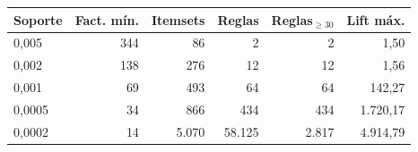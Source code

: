 \begin{tabular}{lrrrrr}
\toprule
\textbf{Soporte} & \textbf{Fact. mín.} & \textbf{Itemsets} & \textbf{Reglas} & \textbf{Reglas$_{\geq 30}$} & \textbf{Lift máx.} \\
\midrule
0,005 & 344 & 86 & 2 & 2 & 1,50 \\
0,002 & 138 & 276 & 12 & 12 & 1,56 \\
0,001 & 69 & 493 & 64 & 64 & 142,27 \\
0,0005 & 34 & 866 & 434 & 434 & 1.720,17 \\
0,0002 & 14 & 5.070 & 58.125 & 2.817 & 4.914,79 \\
\bottomrule
\end{tabular}
